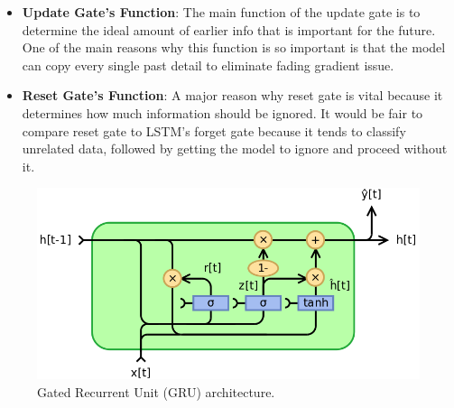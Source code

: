 \begin{itemize}
	\item \textbf{Update Gate’s Function}: The main function of the update gate is to determine the ideal amount of earlier info that is important for the future\cite{gru2}. One of the main reasons why this function is so important is that the model can copy every single past detail to eliminate fading gradient issue.
	\item \textbf{Reset Gate's Function}: A major reason why reset gate\cite{gru2} is vital because it determines how much information should be ignored. It would be fair to compare reset gate to LSTM’s forget gate because it tends to classify unrelated data, followed by getting the model to ignore and proceed without it\cite{gru1}.
\end{itemize}

\begin{figure}[H]
	\centering
	\includegraphics[width=.90\linewidth]{chapters/1_introduction/imgs/gru.png}
	\caption{Gated Recurrent Unit (GRU) architecture.}
	\label{fig:gruarch}
\end{figure}

